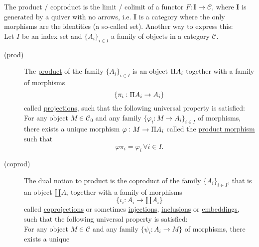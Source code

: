 \begin{definition}\label{def:prod_coprod}
The product / coproduct is the limit / colimit of a functor $F : \mathbf{I} \rightarrow \mathcal{C}$, where $\mathbf{I}$ is generated by a
quiver with no arrows, i.e. $\mathbf{I}$ is a category where the only morphisms are the identities (a so-called set). Another way to express this:\\
Let $I$ be an index set and $\{A_{i}\}_{i\in I}$ a family of objects in a category $\mathcal{C}$.
\begin{description}
\item[(prod)] The \ul{product} of the family $\{A_{i}\}_{i\in I}$ is an object $\invamalg A_{i}$ together with a family of morphisms
\[
\{ \pi_{i} : \invamalg A_{i} \rightarrow A_{i} \}
\]
called \ul{projections}, such that the following universal property is satisfied:\\
For any object $M \in \mathcal{C}_{0}$ and any family $\{ \varphi_{i} : M \rightarrow A_{i} \}_{i\in I}$ of morphisms, there exists
a unique morphism $\varphi : M \rightarrow \invamalg A_{i}$ called the \ul{product morphism} such that
\[
\varphi \pi_{i} = \varphi_{i} \, \forall i \in I.
\]
\item[(coprod)] The dual notion to product is the \ul{coproduct} of the family $\{A_{i}\}_{i\in I}$, that is an object $\amalg A_{i}$ together with
a family of morphisms
\[
\{ \iota_{i} : A_{i} \rightarrow \amalg A_{i} \}
\]
called \ul{coprojections} or sometimes \ul{injections}, \ul{inclusions} or \ul{embeddings}, such that the following universal property is satisfied:\\
For any object $M \in \mathcal{C}$ and any family $\{ \psi_{i} : A_{i} \rightarrow M \}$ of morphisms, there exists a unique

\end{description}
\end{definition}
